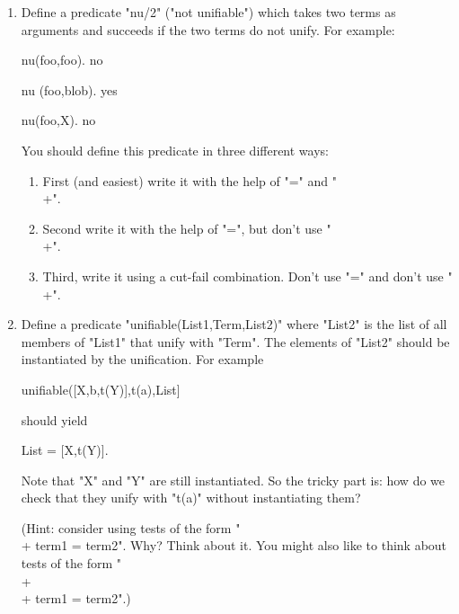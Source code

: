 \begin{enumerate}
\item{}Define a predicate "nu/2" ("not unifiable") which takes two terms as
arguments and succeeds if the two terms do not unify.
For example:
\begin{LPNcodedisplay}
    nu(foo,foo).
    no

    nu (foo,blob).
    yes

    nu(foo,X).
    no
\end{LPNcodedisplay}

You should define this predicate in three different ways:
\begin{enumerate}
\item{}First (and easiest) write it with the help of "=" and
"\\+".
\item{}Second write it with the help of "=", but don't use
"\\+".
\item{}Third, write it using a cut-fail combination. Don't use "=" and
don't use "\\+".
\end{enumerate}

\item{}Define a predicate "unifiable(List1,Term,List2)" where
"List2" is the list of all members of "List1" that unify with
"Term".  The elements of "List2"
should  be instantiated by the unification.
For example
\begin{LPNcodedisplay}
    unifiable([X,b,t(Y)],t(a),List]
\end{LPNcodedisplay}

should yield
\begin{LPNcodedisplay}
    List = [X,t(Y)].
\end{LPNcodedisplay}

Note that "X" and "Y" are still  instantiated. So the tricky part
is: how do we check that they unify  with "t(a)" without instantiating them?

(Hint: consider using tests of the form "\\+ term1 = term2". Why?  Think
about it.  You might also like to think about tests of the form
"\\+ \\+ term1 = term2".)
\end{enumerate}
